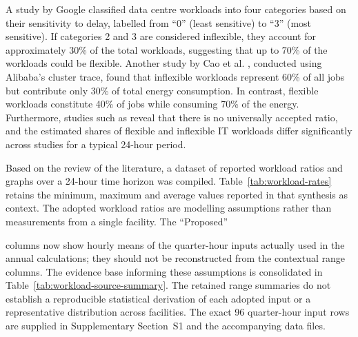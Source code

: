 \documentclass[lettersize,journal]{IEEEtran}
\providecommand{\DIFadd}[1]{{\color{blue}#1}}
\providecommand{\DIFaddbegin}{}
\providecommand{\DIFaddend}{}
\begin{document}
 A study by Google \cite{6779441} classified data centre workloads into four categories based on their sensitivity to delay, labelled from ``0'' (least sensitive) to ``3'' (most sensitive). If categories 2 and 3 are considered inflexible, they account for approximately 30\% of the total workloads, suggesting that up to 70\% of the workloads could be flexible. Another study by Cao et al. \cite{Cao2022ApEn}, conducted using Alibaba’s cluster trace, found that inflexible workloads represent 60\% of all jobs but contribute only 30\% of total energy consumption. In contrast, flexible workloads constitute 40\% of jobs while consuming 70\% of the energy. Furthermore, studies such as \cite{Misaghian2023TIA,Xu2023SPIE,Zhou2024IJEPES,Fu2020ApEn,Liu2012PER} reveal that there is no universally accepted ratio, and the estimated shares of flexible and inflexible IT workloads differ significantly across studies for a typical 24-hour period. 

Based on the review of the literature, a dataset of reported workload ratios and graphs over a 24-hour time horizon was compiled.  \DIFaddbegin \DIFadd{Table~\ref{tab:workload-rates} retains the minimum, maximum and average values reported in that synthesis as context. The adopted workload ratios are modelling assumptions rather than measurements from a single facility. The }\DIFaddend ``Proposed''  \DIFaddbegin \DIFadd{columns now show hourly means of the quarter-hour inputs actually used in the annual calculations; they should not be reconstructed from the contextual range columns. The evidence base informing these assumptions is consolidated in Table~\ref{tab:workload-source-summary}. The retained range summaries do not establish a reproducible statistical derivation of each adopted input or a representative distribution across facilities. The exact 96 quarter-hour input rows are supplied in Supplementary Section~S1 and the accompanying data files.

}\DIFaddend 
\end{document}
